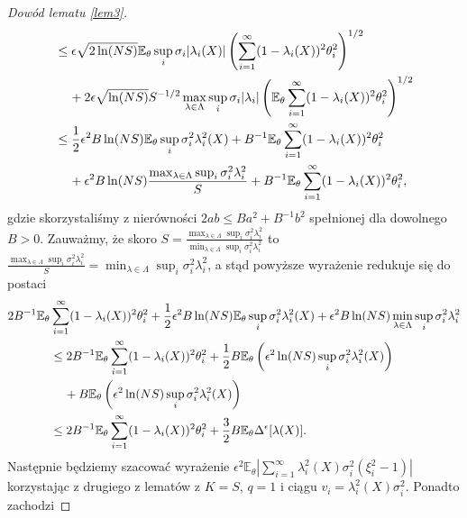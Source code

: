 \documentclass[man,mfiu]{mgrwms}
\begin{document}
\begin{proof}[Dowód lematu \ref{lem3}]
\begin{displaymath}
\begin{split}
&\leq \epsilon\sqrt{2\ln (NS)}\mathbb{E}_{\theta}\sup_i\sigma_i|\lambda_i(X)|\left(\sum_{i=1}^{\infty}(1-\lambda_i(X))^2\theta_i^2\right)^{1/2}\\
&\hspace{4mm}+2\epsilon\sqrt{\ln (NS)}S^{-1/2}\max_{\lambda\in \Lambda}\sup_i\sigma_i|\lambda_i|\left(\mathbb{E}_{\theta}\sum_{i=1}^{\infty}(1-\lambda_i(X))^2\theta_i^2\right)^{1/2}\\
&\leq \frac{1}{2}\epsilon^2B\ln (NS)\mathbb{E}_{\theta}\sup_i\sigma_i^2\lambda_i^2(X)+B^{-1}\mathbb{E}_{\theta}\sum_{i=1}^{\infty}(1-\lambda_i(X))^2\theta_i^2\\
&\hspace{4mm}+\epsilon^2B\ln (NS)\frac{\max_{\lambda\in \Lambda}\sup_i\sigma_i^2\lambda_i^2}{S}+B^{-1}\mathbb{E}_{\theta}\sum_{i=1}^{\infty}(1-\lambda_i(X))^2\theta_i^2,
\end{split}
\end{displaymath}
gdzie skorzystaliśmy z nierówności $2ab\leq Ba^2+B^{-1}b^2$ spełnionej dla dowolnego $B>0$.
Zauważmy, że skoro $S=\frac{\max_{\lambda\in \Lambda}\sup_i\sigma_i^2\lambda_i^2}{\min_{\lambda\in \Lambda}\sup_i\sigma_i^2\lambda_i^2}$ to $\frac{\max_{\lambda\in \Lambda}\sup_i\sigma_i^2\lambda_i^2}{S}=\min_{\lambda\in \Lambda}\sup_i\sigma_i^2\lambda_i^2$, a stąd powyższe wyrażenie redukuje się do postaci
\begin{displaymath}
\begin{split}
2B^{-1}\mathbb{E}_{\theta}&\sum_{i=1}^{\infty}(1-\lambda_i(X))^2\theta_i^2+\frac{1}{2}\epsilon^2B\ln (NS)\mathbb{E}_{\theta}\sup_i\sigma_i^2\lambda_i^2(X)+\epsilon^2B\ln (NS)\min_{\lambda\in \Lambda}\sup_i\sigma_i^2\lambda_i^2\\
&\leq 2B^{-1}\mathbb{E}_{\theta}\sum_{i=1}^{\infty}(1-\lambda_i(X))^2\theta_i^2+\frac{1}{2}B\mathbb{E}_{\theta}\left(\epsilon^2\ln (NS)\sup_i\sigma_i^2\lambda_i^2(X)\right)\\
&\hspace{4mm}+B\mathbb{E}_{\theta}\left(\epsilon^2\ln (NS)\sup_i\sigma_i^2\lambda_i^2(X)\right)\\
&\leq 2B^{-1}\mathbb{E}_{\theta}\sum_{i=1}^{\infty}(1-\lambda_i(X))^2\theta_i^2+\frac{3}{2}B\mathbb{E}_{\theta}\Delta^{\epsilon}[\lambda(X)].
\end{split}
\end{displaymath}
Następnie będziemy szacować wyrażenie $\epsilon^2\mathbb{E}_{\theta}\left|\sum_{i=1}^{\infty}\lambda_i^2(X)\sigma_i^2(\xi^2_i-1)\right|$ korzystając z drugiego z lematów z $K=S$, $q=1$ i ciągu $v_i=\lambda_i^2(X)\sigma_i^2$. Ponadto zachodzi 

\end{proof}
\end{document}

